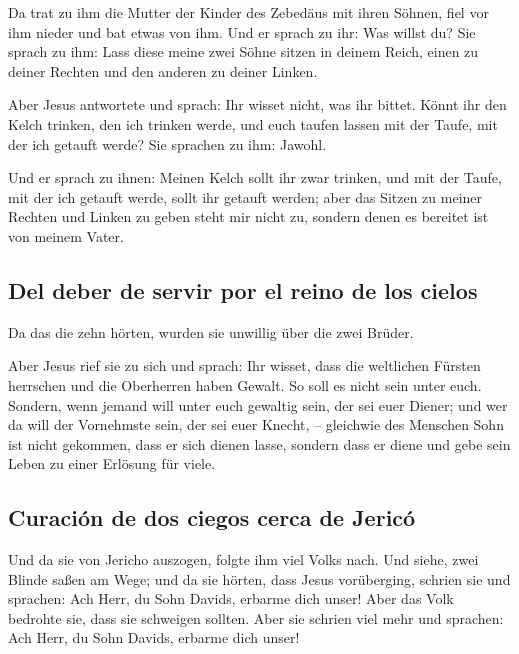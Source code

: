  Da trat zu ihm die Mutter der Kinder des Zebedäus mit
ihren Söhnen, fiel vor ihm nieder und bat etwas von ihm. 
Und er sprach zu ihr: Was willst du? Sie sprach zu ihm: Lass diese meine
zwei Söhne sitzen in deinem Reich, einen zu deiner Rechten und den
anderen zu deiner Linken.

 Aber Jesus antwortete und sprach: Ihr wisset nicht, was
ihr bittet. Könnt ihr den Kelch trinken, den ich trinken werde, und euch
taufen lassen mit der Taufe, mit der ich getauft werde? Sie sprachen zu
ihm: Jawohl.

 Und er sprach zu ihnen: Meinen Kelch sollt ihr zwar
trinken, und mit der Taufe, mit der ich getauft werde, sollt ihr getauft
werden; aber das Sitzen zu meiner Rechten und Linken zu geben steht mir
nicht zu, sondern denen es bereitet ist von meinem Vater.

\hypertarget{del-deber-de-servir-por-el-reino-de-los-cielos}{%
\subsection{Del deber de servir por el reino de los
cielos}\label{del-deber-de-servir-por-el-reino-de-los-cielos}}

 Da das die zehn hörten, wurden sie unwillig über die
zwei Brüder.

 Aber Jesus rief sie zu sich und sprach: Ihr wisset, dass
die weltlichen Fürsten herrschen und die Oberherren haben Gewalt.
 So soll es nicht sein unter euch. Sondern, wenn jemand
will unter euch gewaltig sein, der sei euer Diener;  und
wer da will der Vornehmste sein, der sei euer Knecht, -- 
gleichwie des Menschen Sohn ist nicht gekommen, dass er sich dienen
lasse, sondern dass er diene und gebe sein Leben zu einer Erlösung für
viele.

\hypertarget{curaciuxf3n-de-dos-ciegos-cerca-de-jericuxf3}{%
\subsection{Curación de dos ciegos cerca de
Jericó}\label{curaciuxf3n-de-dos-ciegos-cerca-de-jericuxf3}}

 Und da sie von Jericho auszogen, folgte ihm viel Volks
nach.  Und siehe, zwei Blinde saßen am Wege; und da sie
hörten, dass Jesus vorüberging, schrien sie und sprachen: Ach Herr, du
Sohn Davids, erbarme dich unser!  Aber das Volk bedrohte
sie, dass sie schweigen sollten. Aber sie schrien viel mehr und
sprachen: Ach Herr, du Sohn Davids, erbarme dich unser!

